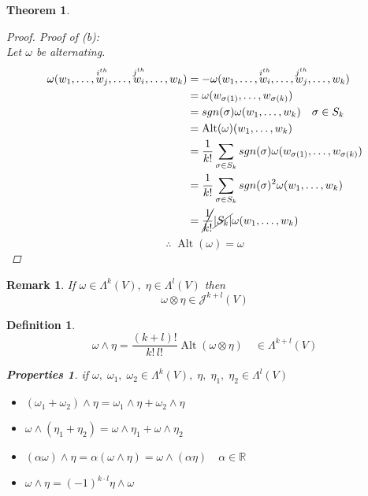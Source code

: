 \documentclass[12pt]{article}
\def\maj{\mathcal{J}}
\def\RR{\mathbb{R}}
\DeclareMathOperator{\alt}{Alt}
\newtheorem{theorem}{Theorem}[section]
\newtheorem{definition}{Definition}[section]
\newtheorem*{remark}{Remark}
\newtheorem*{properties}{Properties}
\begin{document}
\begin{theorem}
\begin{proof}
 Proof of (b):\\
Let $\omega$ be alternating.
\begin{align*}
\omega(w_1, \dots , \overset{i^{th}}{w_j} , \dots , \overset{j^{th}}{w_i} , \dots , w_k) &= - \omega(w_1, \dots , \overset{i^{th}}{w_i} , \dots , \overset{j^{th}}{w_j} , \dots , w_k)\\ &=\omega(w_{\sigma(1)} , \dots , w_{\sigma(k)})\\
&=sgn(\sigma)\omega(w_1,  \dots , w_k) \quad \sigma \in S_k \\
&=\alt(\omega)(w_1,  \dots , w_k)\\
&= \frac{1}{k!}\sum\limits_{\sigma \in S_k}sgn(\sigma)\omega(w_{\sigma(1)}, \dots , w_{\sigma(k)})\\
&= \frac{1}{k!}\sum\limits_{\sigma \in S_k}sgn(\sigma)^2 \omega(w_{1}, \dots , w_{k})\\
&=\cancel{\frac{1}{k!}}\cancel{|S_k|}\omega(w_{1}, \dots , w_{k})
\end{align*}
\[\therefore \; \alt(\omega)=\omega\]
\end{proof}
\end{theorem}

\begin{remark}
If $\omega \in \Lambda^k(V), \; \eta \in \Lambda^l(V)$ then 
\[\omega \otimes \eta \in \maj^{k+l}(V)\]
\end{remark}

\begin{definition}
\[\omega \wedge \eta = \frac{(k+l)!}{k!\,l!}\alt(\omega \otimes \eta) \quad \in \Lambda^{k+l}(V)\]
\begin{properties} if $\omega, \;\omega_1,\; \omega_2 \in \Lambda^k(V), \; \eta, \; \eta_1, \; \eta_2 \in \Lambda^l(V)$
\begin{itemize}
\item $(\omega_1 + \omega_2)\wedge\eta = \omega_1\wedge\eta + \omega_2\wedge\eta$
\item $\omega\wedge(\eta_1 + \eta_2)  = \omega\wedge\eta_1 + \omega\wedge\eta_2$
\item $(\alpha\omega)\wedge\eta = \alpha(\omega\wedge\eta) = \omega\wedge(\alpha\eta) \quad \alpha \in \RR$
\item $\omega\wedge\eta = (-1)^{k\cdot l}\eta\wedge\omega$
\end{itemize}
\end{properties}
\end{definition}
\end{document}
